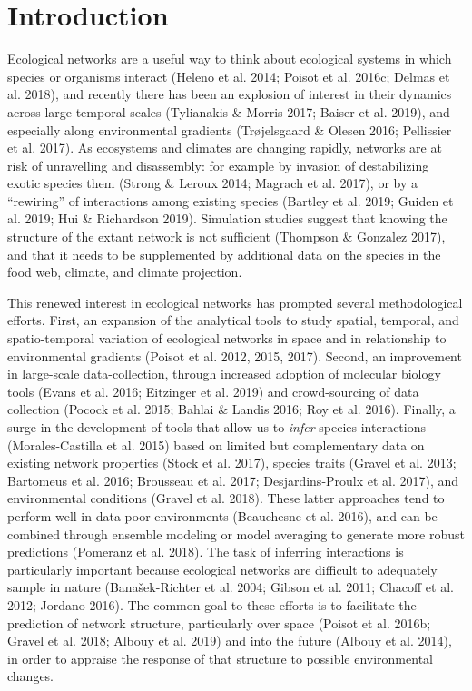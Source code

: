 \hypertarget{introduction}{%
\section{Introduction}\label{introduction}}

Ecological networks are a useful way to think about ecological systems
in which species or organisms interact (Heleno et al. 2014; Poisot et
al. 2016c; Delmas et al. 2018), and recently there has been an explosion
of interest in their dynamics across large temporal scales (Tylianakis
\& Morris 2017; Baiser et al. 2019), and especially along environmental
gradients (Trøjelsgaard \& Olesen 2016; Pellissier et al. 2017). As
ecosystems and climates are changing rapidly, networks are at risk of
unravelling and disassembly: for example by invasion of destabilizing
exotic species them (Strong \& Leroux 2014; Magrach et al. 2017), or by
a ``rewiring'' of interactions among existing species (Bartley et al.
2019; Guiden et al. 2019; Hui \& Richardson 2019). Simulation studies
suggest that knowing the structure of the extant network is not
sufficient (Thompson \& Gonzalez 2017), and that it needs to be
supplemented by additional data on the species in the food web, climate,
and climate projection.

This renewed interest in ecological networks has prompted several
methodological efforts. First, an expansion of the analytical tools to
study spatial, temporal, and spatio-temporal variation of ecological
networks in space and in relationship to environmental gradients (Poisot
et al. 2012, 2015, 2017). Second, an improvement in large-scale
data-collection, through increased adoption of molecular biology tools
(Evans et al. 2016; Eitzinger et al. 2019) and crowd-sourcing of data
collection (Pocock et al. 2015; Bahlai \& Landis 2016; Roy et al. 2016).
Finally, a surge in the development of tools that allow us to
\emph{infer} species interactions (Morales-Castilla et al. 2015) based
on limited but complementary data on existing network properties (Stock
et al. 2017), species traits (Gravel et al. 2013; Bartomeus et al. 2016;
Brousseau et al. 2017; Desjardins-Proulx et al. 2017), and environmental
conditions (Gravel et al. 2018). These latter approaches tend to perform
well in data-poor environments (Beauchesne et al. 2016), and can be
combined through ensemble modeling or model averaging to generate more
robust predictions (Pomeranz et al. 2018). The task of inferring
interactions is particularly important because ecological networks are
difficult to adequately sample in nature (Banašek-Richter et al. 2004;
Gibson et al. 2011; Chacoff et al. 2012; Jordano 2016). The common goal
to these efforts is to facilitate the prediction of network structure,
particularly over space (Poisot et al. 2016b; Gravel et al. 2018; Albouy
et al. 2019) and into the future (Albouy et al. 2014), in order to
appraise the response of that structure to possible environmental
changes.

